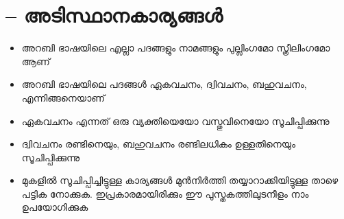 \chapter{\textarabic{ } -- \textmalayalam{അടിസ്ഥാനകാര്യങ്ങൾ}}

\begin{itemize}	    \setlength{\itemsep}{5pt}
	\item അറബി ഭാഷയിലെ എല്ലാ പദങ്ങളും നാമങ്ങളും പുല്ലിംഗമോ സ്ത്രീലിംഗമോ ആണ് 
	\item അറബി ഭാഷയിലെ പദങ്ങൾ ഏകവചനം, ദ്വിവചനം, ബഹുവചനം, എന്നിങ്ങനെയാണ് 
	\item ഏകവചനം എന്നത് ഒരു വ്യക്തിയെയോ വസ്തുവിനെയോ സൂചിപ്പിക്കുന്നു 
	\item ദ്വിവചനം രണ്ടിനെയും, ബഹുവചനം രണ്ടിലധികം ഉള്ളതിനെയും സൂചിപ്പിക്കുന്നു 
	\item മുകളിൽ സൂചിപ്പിച്ചിട്ടുള്ള കാര്യങ്ങൾ മുൻനിർത്തി തയ്യാറാക്കിയിട്ടുള്ള താഴെ പട്ടിക നോക്കുക. ഇപ്രകാരമായിരിക്കും  ഈ പുസ്തകത്തിലുടനീളം  നാം ഉപയോഗിക്കുക
\end{itemize}

